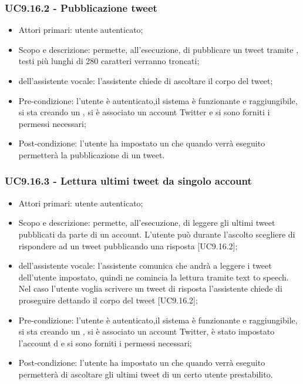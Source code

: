 \subsubsection{UC9.16.2 - Pubblicazione tweet}
\begin{itemize}
	\item  Attori primari: utente autenticato;
	\item  Scopo e descrizione: permette, all'esecuzione, di pubblicare un tweet tramite , testi più lunghi di 280 caratteri verranno troncati;
	\item  {} dell'assistente vocale: l'assistente chiede di ascoltare il corpo del tweet;
	\item  Pre-condizione: l'utente è autenticato,il sistema è funzionante e raggiungibile, si sta creando un , si è associato un account Twitter e si sono forniti i permessi necessari;
	\item  Post-condizione: l'utente ha impostato un  che quando verrà eseguito permetterà la pubblicazione di un tweet.
\end{itemize}
\subsubsection{UC9.16.3 - Lettura ultimi tweet da singolo account}
\begin{itemize}
	\item  Attori primari: utente autenticato;
	\item  Scopo e descrizione: permette, all'esecuzione, di leggere gli ultimi tweet pubblicati da parte di un account. L'utente può durante l'ascolto scegliere di rispondere ad un tweet pubblicando una risposta [UC9.16.2];
	\item  {} dell'assistente vocale: l'assistente comunica che andrà a leggere i tweet dell'utente impostato, quindi ne comincia la lettura tramite text to speech. Nel caso l'utente voglia scrivere un tweet di risposta l'assistente chiede di proseguire dettando il corpo del tweet [UC9.16.2];
	\item  Pre-condizione: l'utente è autenticato,il sistema è funzionante e raggiungibile, si sta creando un , si è associato un account Twitter, è stato impostato l'account d e si sono forniti i permessi necessari;
	\item  Post-condizione: l'utente ha impostato un  che quando verrà eseguito permetterà di ascoltare gli ultimi tweet di un certo utente prestabilito.
\end{itemize}

